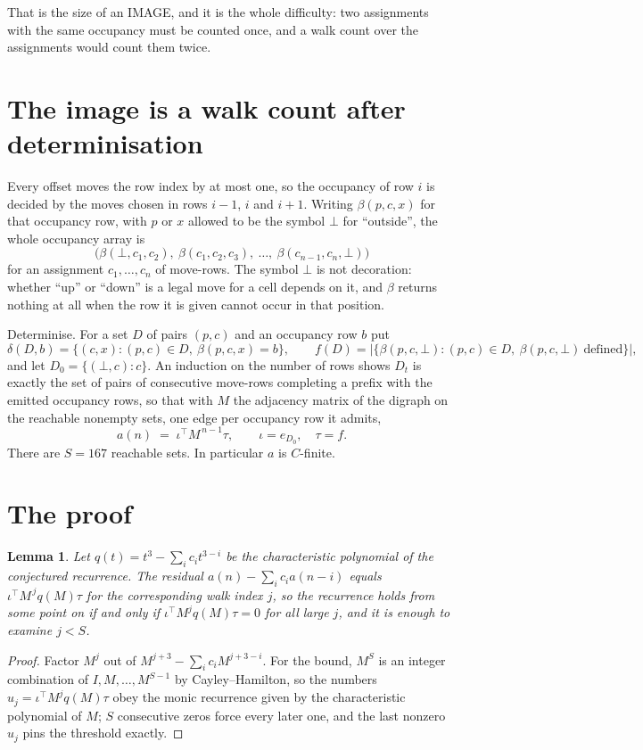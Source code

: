 \documentclass[11pt,a4paper]{article}
\theoremstyle{plain}
\newtheorem{lemma}[theorem]{Lemma}
\theoremstyle{definition}
\begin{document}
That is the size of an IMAGE, and it is the whole difficulty: two assignments with the same
occupancy must be counted once, and a walk count over the assignments would count them twice.

\section{The image is a walk count after determinisation}

Every offset moves the row index by at most one, so the occupancy of row $i$ is decided by the
moves chosen in rows $i-1$, $i$ and $i+1$. Writing $\beta(p,c,x)$ for that occupancy row, with
$p$ or $x$ allowed to be the symbol $\bot$ for ``outside'', the whole occupancy array is
\[
\bigl(\beta(\bot,c_1,c_2),\ \beta(c_1,c_2,c_3),\ \dots,\ \beta(c_{n-1},c_n,\bot)\bigr)
\]
for an assignment $c_1,\dots,c_n$ of move-rows. The symbol $\bot$ is not decoration: whether
``up'' or ``down'' is a legal move for a cell depends on it, and $\beta$ returns nothing at all
when the row it is given cannot occur in that position.

Determinise. For a set $D$ of pairs $(p,c)$ and an occupancy row $b$ put
\[
\delta(D,b)=\{(c,x):(p,c)\in D,\ \beta(p,c,x)=b\},\qquad
f(D)=\bigl|\{\beta(p,c,\bot):(p,c)\in D,\ \beta(p,c,\bot)\ \text{defined}\}\bigr| ,
\]
and let $D_0=\{(\bot,c):c\}$. An induction on the number of rows shows $D_t$ is exactly the
set of pairs of consecutive move-rows completing a prefix with the emitted occupancy rows, so
that with $M$ the adjacency matrix of the digraph on the reachable nonempty sets, one edge per
occupancy row it admits,
\[
a(n)\;=\;\iota^{\!\top}M^{\,n-1}\tau,\qquad \iota=e_{D_0},\quad \tau=f .
\]
There are $S=167$ reachable sets. In particular $a$ is $C$-finite.

\section{The proof}

\begin{lemma}\label{lem:crit}
Let $q(t)=t^{3}-\sum_i c_it^{3-i}$ be the characteristic polynomial of the
conjectured recurrence. The residual $a(n)-\sum_ic_ia(n-i)$ equals
$\iota^{\!\top}M^{\,j}q(M)\tau$ for the corresponding walk index $j$, so the recurrence
holds from some point on if and only if $\iota^{\!\top}M^{j}q(M)\tau=0$ for all large $j$,
and it is enough to examine $j<S$.
\end{lemma}

\begin{proof}
Factor $M^{j}$ out of $M^{j+3}-\sum_ic_iM^{j+3-i}$. For the bound, $M^{S}$
is an integer combination of $I,M,\dots,M^{S-1}$ by Cayley--Hamilton, so the numbers
$u_j=\iota^{\!\top}M^{j}q(M)\tau$ obey the monic recurrence given by the characteristic
polynomial of $M$; $S$ consecutive zeros force every later one, and the last nonzero $u_j$
pins the threshold exactly.
\end{proof}
\end{document}
